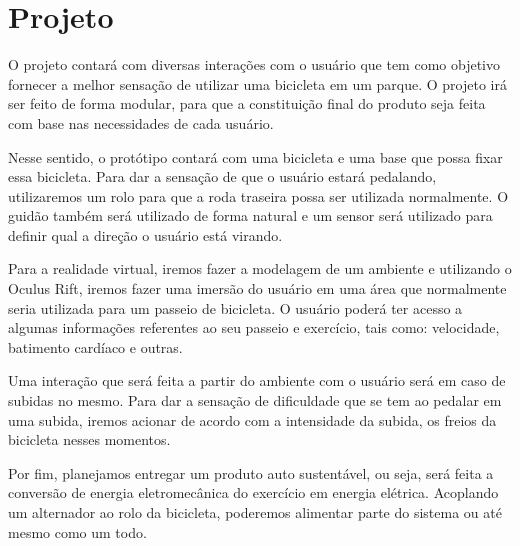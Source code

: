 \chapter*[Projeto]{Projeto}
O projeto contará com diversas interações com o usuário que tem como objetivo fornecer a melhor sensação de utilizar uma bicicleta em um parque. O projeto irá ser feito de forma modular, para que a constituição final do produto seja feita com base nas necessidades de cada usuário. 

Nesse sentido, o protótipo contará com uma bicicleta e uma base que possa fixar essa bicicleta. Para dar a sensação de que o usuário estará pedalando, utilizaremos um rolo para que a roda traseira possa ser utilizada normalmente. O guidão também será utilizado de forma natural e um sensor será utilizado para definir qual a direção o usuário está virando. 

Para a realidade virtual, iremos fazer a modelagem de um ambiente e utilizando o Oculus Rift, iremos fazer uma imersão do usuário em uma área que normalmente seria utilizada para um passeio de bicicleta. O usuário poderá ter acesso a algumas informações referentes ao seu passeio e exercício, tais como: velocidade, batimento cardíaco e outras. 

Uma interação que será feita a partir do ambiente com o usuário será em caso de subidas no mesmo. Para dar a sensação de dificuldade que se tem ao pedalar em uma subida, iremos acionar de acordo com a intensidade da subida, os freios da bicicleta nesses momentos. 

Por fim, planejamos entregar um produto auto sustentável, ou seja, será feita a conversão de energia eletromecânica do exercício em energia elétrica. Acoplando um alternador ao rolo da bicicleta, poderemos alimentar parte do sistema ou até mesmo como um todo.

